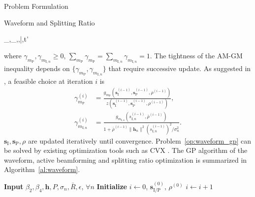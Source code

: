 \documentclass[journal]{IEEEtran}
\begin{document}
\begin{section}{Problem Formulation}
\begin{subsection}{Waveform and Splitting Ratio}
			\begin{mini!}
				{_{},_,\rho,\bar{\rho},t'}{}{\label{op:waveform_gp}}{}
			\end{mini!}
			where $\gamma_{m_\mathrm{P}},\gamma_{m_{\mathrm{I},n}} \ge 0$, $\sum_{m_\mathrm{P}}\gamma_{m_\mathrm{P}}=\sum_{m_{\mathrm{I},n}}\gamma_{m_{\mathrm{I},n}}=1$. The tightness of the AM-GM inequality depends on $\{\gamma_{m_\mathrm{P}},\gamma_{m_{\mathrm{I},n}}\}$ that require successive update. As suggested in \cite{Clerckx2018b}, a feasible choice at iteration $i$ is
			\begin{align}
				\gamma_{m_\mathrm{P}}^{(i)} & = \frac{g_{m_\mathrm{P}}(\boldsymbol{s}_{\mathrm{I}}^{(i-1)},\boldsymbol{s}_\mathrm{P}^{(i-1)},\rho^{(i-1)})}{z(\boldsymbol{s}_{\mathrm{I}}^{(i-1)},\boldsymbol{s}_\mathrm{P}^{(i-1)},\rho^{(i-1)})}\label{eq:gamma_P},\\
				\gamma_{m_{\mathrm{I},n}}^{(i)} & = \frac{g_{m_{\mathrm{I},n}}(s_{\mathrm{I},n}^{(i-1)},\bar{\rho}^{(i-1)})}{1+{\bar{\rho}^{(i-1)}\lVert{\boldsymbol{h}_n}\rVert^2 (s_{\mathrm{I},n}^{(i-1)})^2}\big/{\sigma_n^2}}.\label{eq:gamma_I}
			\end{align}
			$\boldsymbol{s}_{\mathrm{I}},\boldsymbol{s}_\mathrm{P},\rho$ are updated iteratively until convergence. Problem~\eqref{op:waveform_gp} can be solved by existing optimization tools such as CVX \cite{Grant2013}. The GP algorithm of the waveform, active beamforming and splitting ratio optimization is summarized in Algorithm~\ref{al:waveform}.
			\begin{algorithm}[!t]
				\caption{GP: Waveform, Active Beamforming and Splitting Ratio.}
				\label{al:waveform}
				\begin{algorithmic}[1]
					\State \textbf{Input} $\beta_2,\beta_4,\boldsymbol{h},P,\sigma_n,\bar{R},\epsilon$, $\forall n$
					\State \textbf{Initialize} $i \gets 0$, $\boldsymbol{s}_{\mathrm{I/P}}^{(0)}$, $\rho^{(0)}$
					\Repeat
						\State $i \gets i + 1$

\end{algorithmic}
\end{algorithm}
\end{subsection}
\end{section}
\end{document}
